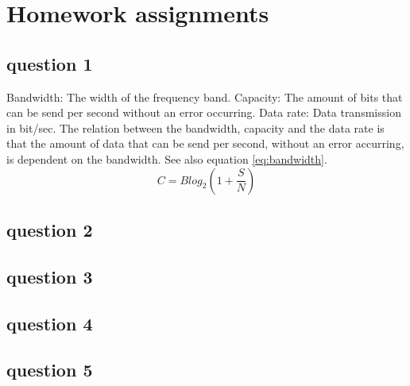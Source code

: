 \documentclass[final]{scrreprt} %
\begin{document}
\chapter{Homework assignments}
\label{homework}
\section{question 1}
Bandwidth: The width of the frequency band.
Capacity: The amount of bits that can be send per second without an error occurring. 
Data rate: Data transmission in bit/sec.
The relation between the bandwidth, capacity and the data rate is that the amount of data that can be send per second, without an error accurring, is dependent on the bandwidth. See also equation \ref{eq:bandwidth}.
\begin{equation}
\label{eq:bandwidth}
C= B log_{2}(1+\frac{S}{N})
\end{equation}
\section{question 2}
\section{question 3}
\section{question 4}
\section{question 5}
\end{document}
